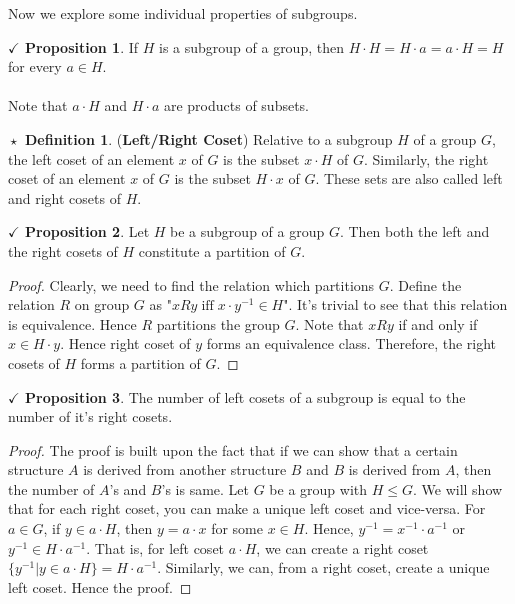 \documentclass{article}
\theoremstyle{definition}
\newtheorem{definition}{$\boxed{\star}$ Definition}
\theoremstyle{remark}
\theoremstyle{definition}
\theoremstyle{definition}
\newtheorem{proposition}{$\checkmark$ Proposition}
\theoremstyle{definition}
\theoremstyle{proof}
\newcommand{\inv}[1]{#1^{-1}}
\begin{document}
Now we explore some individual properties of subgroups.
\begin{proposition}
	If $ H $ is a subgroup of a group, then $ H\cdot H = H\cdot a = a\cdot H = H$ for every $ a \in H $.\\\\
	Note that $ a\cdot H $ and $ H\cdot a $ are products of subsets.	
\end{proposition}
\hrulefill
\begin{definition}
	(\textbf{Left/Right Coset}) Relative to a subgroup $ H $ of a group $ G $, the left coset of an element $ x $ of $ G $ is the subset $ x\cdot H $ of $ G $. Similarly, the right coset of an element $ x $ of $ G $ is the subset $ H\cdot x $ of $ G $. These sets are also called left and right cosets of $ H $.
\end{definition}
\hrulefill
\begin{proposition}
	Let $ H $ be a subgroup of a group $ G $. Then both the left and the right cosets of $ H $ constitute a partition of $ G $.
\end{proposition}
\begin{proof}
	Clearly, we need to find the relation which partitions $ G $. Define the relation $ R $ on group $ G $ as "$ xRy \;\text{iff}\; x\cdot \inv{y} \in H$". It's trivial to see that this relation is equivalence. Hence $ R $ partitions the group $ G $. Note that $ xRy $ if and only if $ x \in H\cdot y $. Hence right coset of $ y $ forms an equivalence class. Therefore, the right cosets of $ H $ forms a partition of $ G $.
\end{proof}
\hrulefill
\begin{proposition}
	The number of left cosets of a subgroup is equal to the number of it's right cosets.
\end{proposition}
\begin{proof}
	The proof is built upon the fact that if we can show that a certain structure $ A $ is derived from another structure $ B $ and $ B $ is derived from $ A $, then the number of $ A $'s and $ B $'s is same. Let $ G $ be a group with $ H \le G $. We will show that for each right coset, you can make a unique left coset and vice-versa. For $ a \in G $, if $ y \in a\cdot H $, then $ y = a\cdot x $ for some $ x \in H $. Hence, $ \inv{y} = \inv{x} \cdot \inv{a} $ or $ \inv{y} \in H \cdot \inv{a} $. That is, for left coset $ a\cdot H $, we can create a right coset $ \{\inv{y} \vert y \in a\cdot H\} = H\cdot \inv{a}$. Similarly, we can, from a right coset, create a unique left coset. Hence the proof.
\end{proof}
\end{document}
